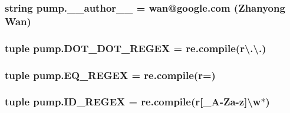 \subsubsection[{\+\_\+\+\_\+author\+\_\+\+\_\+}]{\setlength{\rightskip}{0pt plus 5cm}string pump.\+\_\+\+\_\+author\+\_\+\+\_\+ = \textquotesingle{}wan@google.\+com (Zhanyong Wan)\textquotesingle{}}\label{namespacepump_ab99a065546038823261c774117df0798}
\hypertarget{namespacepump_a7ceff323392938f56a70e8612f51294c}{}
\subsubsection[{D\+O\+T\+\_\+\+D\+O\+T\+\_\+\+R\+E\+G\+E\+X}]{\setlength{\rightskip}{0pt plus 5cm}tuple pump.\+D\+O\+T\+\_\+\+D\+O\+T\+\_\+\+R\+E\+G\+E\+X = re.\+compile(r\textquotesingle{}\textbackslash{}.\textbackslash{}.\textquotesingle{})}\label{namespacepump_a7ceff323392938f56a70e8612f51294c}
\hypertarget{namespacepump_a7f1b6c8a70ec140d90340ae8276143a6}{}
\subsubsection[{E\+Q\+\_\+\+R\+E\+G\+E\+X}]{\setlength{\rightskip}{0pt plus 5cm}tuple pump.\+E\+Q\+\_\+\+R\+E\+G\+E\+X = re.\+compile(r\textquotesingle{}=\textquotesingle{})}\label{namespacepump_a7f1b6c8a70ec140d90340ae8276143a6}
\hypertarget{namespacepump_a11804cc01a8aef9c8700d3e44e0b518f}{}
\subsubsection[{I\+D\+\_\+\+R\+E\+G\+E\+X}]{\setlength{\rightskip}{0pt plus 5cm}tuple pump.\+I\+D\+\_\+\+R\+E\+G\+E\+X = re.\+compile(r\textquotesingle{}\mbox{[}\+\_\+\+A-\/Za-\/z\mbox{]}\textbackslash{}w$\ast$\textquotesingle{})}\label{namespacepump_a11804cc01a8aef9c8700d3e44e0b518f}
\hypertarget{namespacepump_ad9744f334322fa37e310075e5e1ec40c}{}
